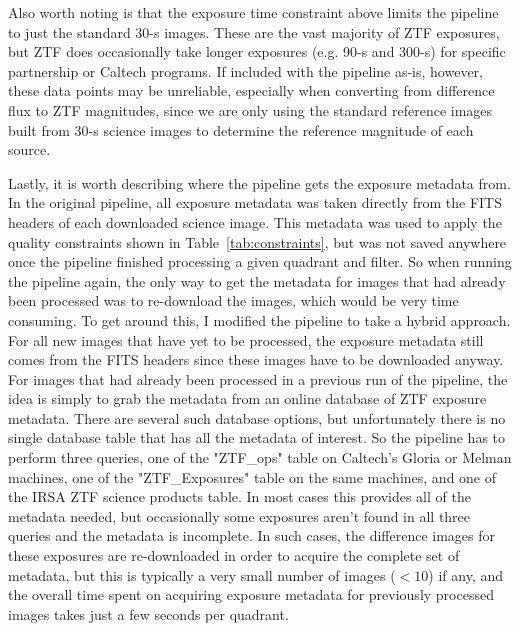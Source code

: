 \documentclass[12pt]{article}
\begin{document}
\begin{enumerate}
    Also worth noting is that the exposure time constraint above limits the pipeline to just the standard 30-s images. These are the vast majority of ZTF exposures, but ZTF does occasionally take longer exposures (e.g. 90-s and 300-s) for specific partnership or Caltech programs. If included with the pipeline as-is, however, these data points may be unreliable, especially when converting from difference flux to ZTF magnitudes, since we are only using the standard reference images built from 30-s science images to determine the reference magnitude of each source.

    Lastly, it is worth describing where the pipeline gets the exposure metadata from. In the original pipeline, all exposure metadata was taken directly from the FITS headers of each downloaded science image. This metadata was used to apply the quality constraints shown in Table~\ref{tab:constraints}, but was not saved anywhere once the pipeline finished processing a given quadrant and filter. So when running the pipeline again, the only way to get the metadata for images that had already been processed was to re-download the images, which would be very time consuming. To get around this, I modified the pipeline to take a hybrid approach. For all new images that have yet to be processed, the exposure metadata still comes from the FITS headers since these images have to be downloaded anyway. For images that had already been processed in a previous run of the pipeline, the idea is simply to grab the metadata from an online database of ZTF exposure metadata. There are several such database options, but unfortunately there is no single database table that has all the metadata of interest. So the pipeline has to perform three queries, one of the "ZTF\_ops" table on Caltech's Gloria or Melman machines, one of the "ZTF\_Exposures" table on the same machines, and one of the IRSA ZTF science products table. In most cases this provides all of the metadata needed, but occasionally some exposures aren't found in all three queries and the metadata is incomplete. In such cases, the difference images for these exposures are re-downloaded in order to acquire the complete set of metadata, but this is typically a very small number of images ($<10$) if any, and the overall time spent on acquiring exposure metadata for previously processed images takes just a few seconds per quadrant. 
    

\end{enumerate}
\end{document}
